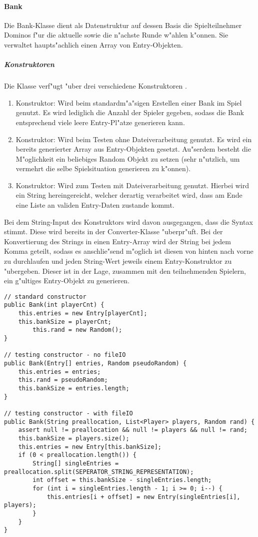 \paragraph{Bank}
\label{par:bank}
Die Bank-Klasse dient als Datenstruktur auf dessen Basis die Spielteilnehmer Dominos f"ur die aktuelle sowie die n"achste Runde w"ahlen k"onnen. Sie verwaltet haupts"achlich einen Array von Entry-Objekten. 

\subparagraph{Konstruktoren}
Die Klasse verf"ugt "uber drei verschiedene Konstruktoren .
\begin{enumerate}
	\item Konstruktor: Wird beim standardm"a"sigen Erstellen einer Bank im Spiel genutzt. Es wird lediglich die Anzahl der Spieler gegeben, sodass die Bank entsprechend viele leere Entry-Pl"atze generieren kann. 
	\item Konstruktor: Wird beim Testen ohne Dateiverarbeitung genutzt. Es wird ein bereits generierter Array aus Entry-Objekten gesetzt. Au"serdem besteht die M"oglichkeit ein beliebiges Random Objekt zu setzen (sehr n"utzlich, um vermehrt die selbe Spielsituation generieren zu k"onnen). 
	\item Konstruktor: Wird zum Testen mit Dateiverarbeitung genutzt. Hierbei wird ein String hereingereicht, welcher derartig verarbeitet wird, dass am Ende eine Liste an validen Entry-Daten zustande kommt. 
\end{enumerate}
Bei dem String-Input des Konstruktors wird davon ausgegangen, dass die Syntax stimmt. Diese wird bereits in der Converter-Klasse "uberpr"uft. Bei der Konvertierung des Strings in einen Entry-Array wird der String bei jedem Komma geteilt, sodass es anschlie"send m"oglich ist diesen von hinten nach vorne zu durchlaufen und jeden String-Wert jeweils einem Entry-Konstruktor zu "ubergeben. Dieser ist in der Lage, zusammen mit den teilnehmenden Spielern, ein g"ultiges Entry-Objekt zu generieren. 
\begin{lstlisting}[style=CodeHighlighting,float,caption=Bank - Konstruktor,label=lst:bank_konstruktor]
// standard constructor 
public Bank(int playerCnt) {
    this.entries = new Entry[playerCnt];
    this.bankSize = playerCnt;
        this.rand = new Random();
}

// testing constructor - no fileIO
public Bank(Entry[] entries, Random pseudoRandom) {
    this.entries = entries;
    this.rand = pseudoRandom;
    this.bankSize = entries.length;
}

// testing constructor - with fileIO
public Bank(String preallocation, List<Player> players, Random rand) {
    assert null != preallocation && null != players && null != rand;
    this.bankSize = players.size();
    this.entries = new Entry[this.bankSize];
    if (0 < preallocation.length()) {
        String[] singleEntries = preallocation.split(SEPERATOR_STRING_REPRESENTATION);
        int offset = this.bankSize - singleEntries.length;
        for (int i = singleEntries.length - 1; i >= 0; i--) {
            this.entries[i + offset] = new Entry(singleEntries[i], players);
        }
    }
}
\end{lstlisting}

